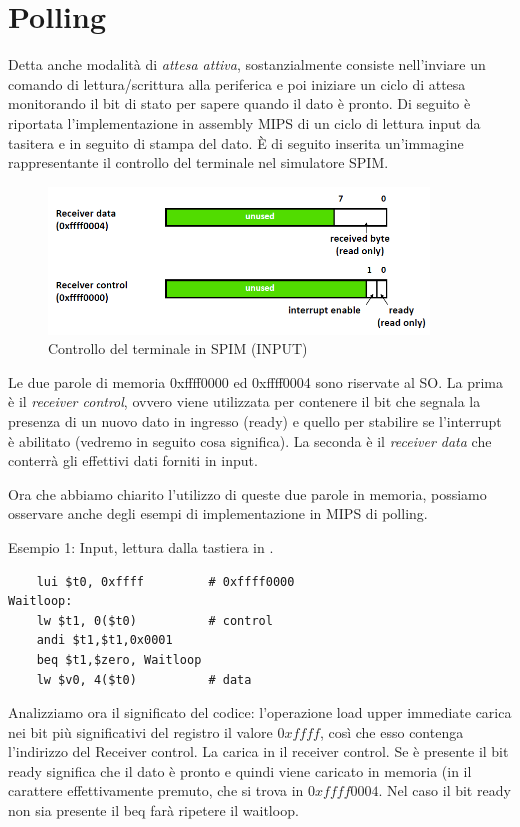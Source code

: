 \documentclass[class=book, crop=false, oneside]{standalone}
\begin{document}
\section{Polling}
Detta anche modalità di \emph{attesa attiva}, sostanzialmente consiste nell'inviare un comando di lettura/scrittura alla periferica e poi iniziare un ciclo di attesa monitorando il bit di stato per sapere quando il dato è pronto. Di seguito è riportata l'implementazione in assembly MIPS di un ciclo di lettura input da tasitera e in seguito di stampa del dato. È di seguito inserita un'immagine rappresentante il controllo del terminale nel simulatore SPIM.
\begin{figure}[!h]
	\centering
	\includegraphics[width=0.9\textwidth,keepaspectratio]{SPIM1}
	\caption{Controllo del terminale in SPIM (INPUT)}
\end{figure}

Le due parole di memoria 0xffff0000 ed 0xffff0004 sono riservate al SO.
La prima è il \emph{receiver control}, ovvero viene utilizzata per contenere il bit che segnala la presenza di un nuovo dato in ingresso (ready) e quello per stabilire se l'interrupt è abilitato (vedremo in seguito cosa significa). La seconda è il \emph{receiver data} che conterrà gli effettivi dati forniti in input.

Ora che abbiamo chiarito l'utilizzo di queste due parole in memoria, possiamo osservare anche degli esempi di implementazione in MIPS di polling.

Esempio 1: Input, lettura dalla tastiera in .
\begin{verbatim}
	lui $t0, 0xffff         # 0xffff0000
Waitloop:
	lw $t1, 0($t0)          # control
	andi $t1,$t1,0x0001
	beq $t1,$zero, Waitloop
	lw $v0, 4($t0)          # data
\end{verbatim}
Analizziamo ora il significato del codice: l'operazione load upper immediate carica nei bit più significativi del registro  il valore \(0xffff\), così che esso contenga l'indirizzo del Receiver control. La  carica in  il receiver control. Se è presente il bit ready significa che il dato è pronto e quindi viene caricato in memoria (in  il carattere effettivamente premuto, che si trova in \(0xffff0004\). Nel caso il bit ready non sia presente il beq farà ripetere il waitloop.
\end{document}
